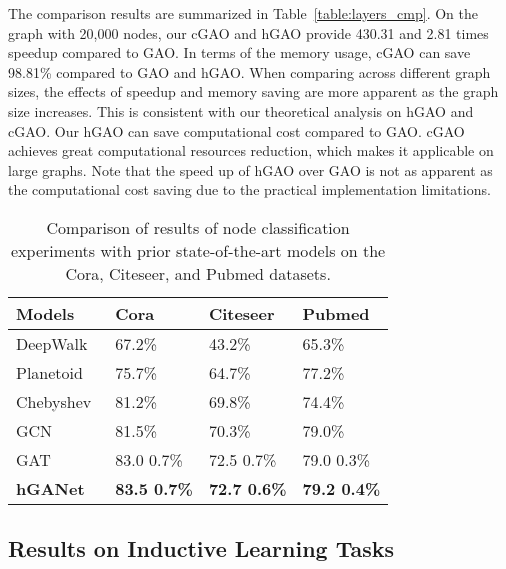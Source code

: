 \documentclass[sigconf]{acmart}
\begin{document}
The comparison results are summarized in Table~\ref{table:layers_cmp}. On the
graph with 20,000 nodes, our cGAO and hGAO provide 430.31 and 2.81 times
speedup compared to GAO. In terms of the memory usage, cGAO can save 98.81\%
compared to GAO and hGAO. When comparing across different graph sizes, the
effects of speedup and memory saving are more apparent as the graph size
increases. This is consistent with our theoretical analysis on hGAO and cGAO.
Our hGAO can save computational cost compared to GAO. cGAO achieves great
computational resources reduction, which makes it applicable on large graphs.
Note that the speed up of hGAO over GAO is not as apparent as the
computational cost saving due to the practical implementation limitations.

\begin{table}[t]
\centering \caption{Comparison of results of node classification experiments with
prior state-of-the-art models on the Cora, Citeseer, and Pubmed datasets.}
\label{table:trans}
\begin{tabularx}{\columnwidth}{  X YYY  }
    \hline
    \textbf{Models} & \textbf{Cora} & \textbf{Citeseer} & \textbf{Pubmed} \\ \hline\hline
    DeepWalk~\cite{perozzi2014deepwalk}            & 67.2\% & 43.2\%  & 65.3\%   \\ \hline
    Planetoid~\cite{yang2016revisiting}            & 75.7\% & 64.7\%  & 77.2\%   \\ \hline
    Chebyshev~\cite{defferrard2016convolutional}   & 81.2\% & 69.8\%  & 74.4\%   \\ \hline
    GCN~\cite{kipf2016semi}                        & 81.5\% & 70.3\%  & 79.0\%   \\ \hline
    GAT~\cite{velivckovic2017graph}                & 83.0  0.7\% & 72.5  0.7\% & 79.0  0.3\% \\ \hline
\textbf{hGANet}                             & \textbf{83.5  0.7\%}
                                                & \textbf{72.7  0.6\%}
                                                & \textbf{79.2  0.4\%} \\ \hline
    \hline
\end{tabularx}
\end{table}

\subsection{Results on Inductive Learning Tasks}
\end{document}
